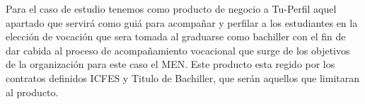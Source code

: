 Para el caso de estudio tenemos como producto de negocio a Tu-Perfil aquel apartado que servirá como guiá para acompañar y perfilar a los estudiantes en la elección de vocación que sera tomada al graduarse como bachiller con el fin de dar cabida al proceso de acompañamiento vocacional que surge de los objetivos de la organización para este caso el MEN.  Este producto esta regido por los contratos definidos ICFES y Titulo de Bachiller, que serán aquellos que limitaran al producto.